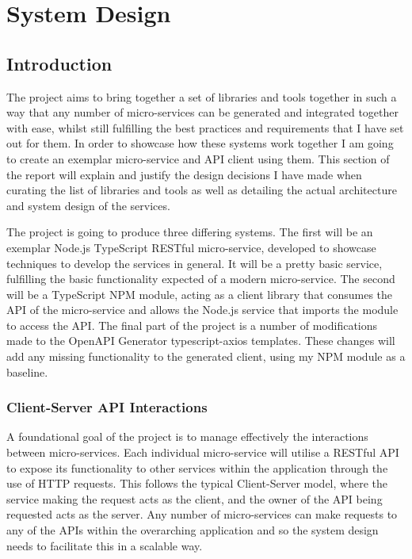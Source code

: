 \chapter{System Design}
\section{Introduction}

The project aims to bring together a set of libraries and tools together in such a way that any number of micro-services can be generated and integrated together with ease, whilst still fulfilling the best practices and requirements that I have set out for them. In order to showcase how these systems work together I am going to create an exemplar micro-service and API client using them. This section of the report will explain and justify the design decisions I have made when curating the list of libraries and tools as well as detailing the actual architecture and system design of the services.

The project is going to produce three differing systems. The first will be an exemplar Node.js TypeScript RESTful micro-service, developed to showcase techniques to develop the services in general.  It will be a pretty basic service, fulfilling the basic functionality expected of a modern micro-service. The second will be a TypeScript NPM module, acting as a client library that consumes the API of the micro-service and allows the Node.js service that imports the module to access the API. The final part of the project is a number of modifications made to the OpenAPI Generator typescript-axios templates. These changes will add any missing functionality to the generated client, using my NPM module as a baseline.

\subsection{Client-Server API Interactions}

A foundational goal of the project is to manage effectively the interactions between micro-services. Each individual micro-service will utilise a RESTful API to expose its functionality to other services within the application through the use of HTTP requests. This follows the typical Client-Server model, where the service making the request acts as the client, and the owner of the API being requested acts as the server. Any number of micro-services can make requests to any of the APIs within the overarching application and so the system design needs to facilitate this in a scalable way.

